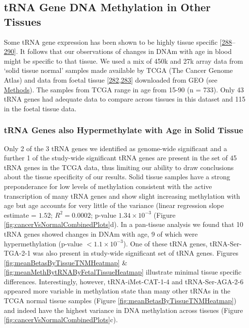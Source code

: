 \documentclass[
]{book}
\begin{document}
\hypertarget{trna-gene-dna-methylation-in-other-tissues}{%
\subsection{tRNA Gene DNA Methylation in Other Tissues}\label{trna-gene-dna-methylation-in-other-tissues}}

Some tRNA gene expression has been shown to be highly tissue specific {[}\protect\hyperlink{ref-Schmitt2014b}{288}--\protect\hyperlink{ref-Sagi2016}{290}{]}.
It follows that our observations of changes in DNAm with age in blood might be specific to that tissue.
We used a mix of 450k and 27k array data from `solid tissue normal' samples made available by TCGA (The Cancer Genome Atlas) and data from foetal tissue {[}\protect\hyperlink{ref-Yang2016}{282},\protect\hyperlink{ref-Nazor2012}{283}{]} downloaded from GEO (see \protect\hyperlink{TCGAmethods}{Methods}).
The samples from TCGA range in age from 15-90 (n = 733).
Only 43 tRNA genes had adequate data to compare across tissues in this dataset and 115 in the foetal tissue data.

\hypertarget{trna-genes-also-hypermethylate-with-age-in-solid-tissue}{%
\subsubsection{tRNA Genes also Hypermethylate with Age in Solid Tissue}\label{trna-genes-also-hypermethylate-with-age-in-solid-tissue}}

Only 2 of the 3 tRNA genes we identified as genome-wide significant and a further 1 of the study-wide significant tRNA genes are present in the set of 45 tRNA genes in the TCGA data, thus limiting our ability to draw conclusions about the tissue specificity of our results.
Solid tissue samples have a strong preponderance for low levels of methylation consistent with the active transcription of many tRNA genes and show slight increasing methylation with age but age accounts for very little of the variance (linear regression slope estimate = \(1.52\); \(R^2= 0.0002\); p-value \(1.34\times10^{-3}\) (Figure \ref{fig:cancerVsNormalCombinedPlots}d).
In a pan-tissue analysis we found that 10 tRNA genes showed changes in DNAm with age, 9 of which were hypermethylation (p-value \(<1.1\times10^{-3}\)).
One of these tRNA genes, tRNA-Ser-TGA-2-1 was also present in study-wide significant set of tRNA genes.
Figures \ref{fig:meanBetasByTissueTNMHeatmap} \& \ref{fig:meanMethBytRNAByFetalTissueHeatmap} illustrate minimal tissue specific differences.
Interestingly, however, tRNA-iMet-CAT-1-4 and tRNA-Ser-AGA-2-6 appeared more variable in methylation state than many other tRNAs in the TCGA normal tissue samples (Figure \ref{fig:meanBetasByTissueTNMHeatmap}) and indeed have the highest variance in DNA methylation across tissues (Figure \ref{fig:cancerVsNormalCombinedPlots}c).
\end{document}
